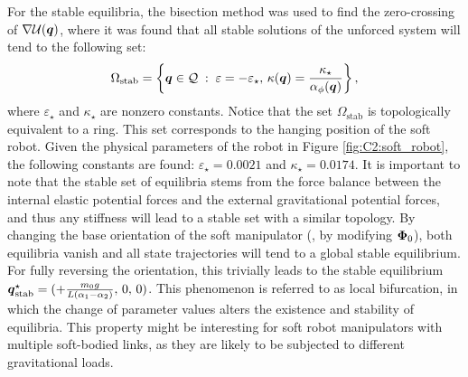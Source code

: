 For the stable equilibria, the bisection method was used to find the zero-crossing of $\nabla \mathcal{U}({{\boldsymbol{q}}})$, where it was found that all stable solutions of the unforced system will tend to the following set:
%
\begin{equation*}
\Omega_{\textrm{stab}} = \left\{{\boldsymbol{q}}\in \mathcal{Q}\;:\;\varepsilon=-\varepsilon_\star,\, \kappa({\boldsymbol{q}}) = \frac{\kappa_\star}{\alpha_\phi({\boldsymbol{q}})} \right\}, \notag
\end{equation*}
%
where $\varepsilon_\star$ and $\kappa_\star$ are nonzero constants. Notice that the set $\Omega_{\textrm{stab}}$ is topologically equivalent to a ring. This set corresponds to the hanging position of the soft robot. Given the physical parameters of the robot in Figure \ref{fig:C2:soft_robot}, the following constants are found: $\varepsilon_\star = 0.0021$ and $\kappa_\star = 0.0174$.  It is important to note that  the stable set of equilibria stems from the force balance between the internal elastic potential forces and the external gravitational potential forces, and thus any stiffness will lead to a stable set with a similar topology. By changing the base orientation of the soft manipulator (\ie, by modifying ${\boldsymbol{\Phi}}_0$), both equilibria vanish and all state trajectories will tend to a global stable equilibrium. For fully reversing the orientation, this trivially leads to the stable equilibrium ${\boldsymbol{q}}^\star_{\textrm{stab}} = (+\tfrac{m_0 g}{L (\alpha_1 - \alpha_2)},\, 0,\, 0)$. This phenomenon is referred to as local bifurcation, in which the change of parameter values alters the existence and stability of equilibria. This property might be interesting for soft robot manipulators with multiple soft-bodied links, as they are likely to be subjected to different gravitational loads.
%
